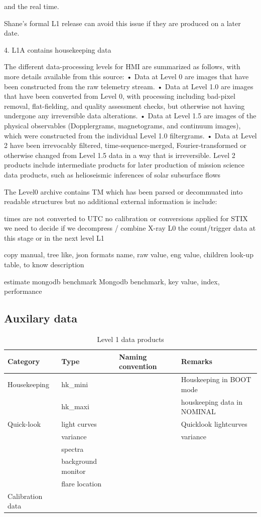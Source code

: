 \documentclass{aa}
\begin{document}
   and the real time.

    Shane's formal L1 release can avoid this issue if they are produced on a later date.

4. L1A contains housekeeping data

The different data-processing levels for HMI are summarized as follows, with more details available from this source:
• Data at Level 0 are images that have been constructed from the raw telemetry stream.
• Data at Level 1.0 are images that have been converted from Level 0, with processing including bad-pixel removal, flat-fielding,
and quality assessment checks, but otherwise not having undergone any irreversible data alterations.
• Data at Level 1.5 are images of the physical observables (Dopplergrams, magnetograms, and continuum images), which were
constructed from the individual Level 1.0 filtergrams.
• Data at Level 2 have been irrevocably filtered, time-sequence-merged, Fourier-transformed or otherwise changed from Level 1.5
data in a way that is irreversible. Level 2 products include intermediate products for later production of mission science data
products, such as helioseismic inferences of solar subsurface flows


The Level0 archive contains TM which has been parsed or decommuated into readable structures but no additional external information is include:

times are not converted to UTC
no calibration or conversions applied
for STIX we need to decide if we decompress / combine X-ray L0 the count/trigger data at this stage or in the next level L1

copy manual,
tree like, 
json formats
name, raw value, eng value, children
look-up table, to know description

estimate mongodb benchmark
Mongodb benchmark,
key value, index, performance


\subsection{Auxilary data}



\begin{table}
\centering
\caption{Level 1 data products}
\begin{tabular}{llll}
Category & Type   &  Naming convention  & Remarks   \\ \hline
 Housekeeping & hk\_mini  &  & Houskeeping in BOOT mode   \\
 & hk\_maxi  &  & houskeeping data in NOMINAL   \\
 Quick-look &  light curves &  & Quicklook lightcurves \\
  &  variance &  & variance \\
  &  spectra &  &  \\
  &  background monitor &  &  \\
    &  flare location &  &  \\
 Calibration data &   &  &  \\
\end{tabular}
\end{table}
\end{document}
